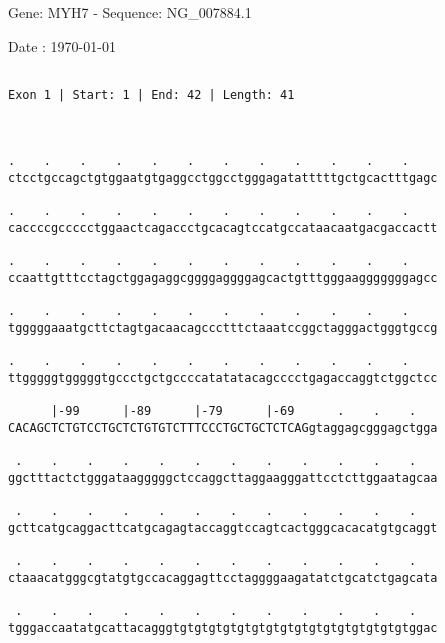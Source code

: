 \documentclass{article}
\begin{document}
\begin{center}
\begin{large}
 Gene: MYH7 - Sequence: NG\_007884.1
 
 Date : \today
\end{large}
\end{center}
 \begin{Verbatim}
 
Exon 1 | Start: 1 | End: 42 | Length: 41



.    .    .    .    .    .    .    .    .    .    .    .    
ctcctgccagctgtggaatgtgaggcctggcctgggagatatttttgctgcactttgagc
                                                            
.    .    .    .    .    .    .    .    .    .    .    .    
caccccgccccctggaactcagaccctgcacagtccatgccataacaatgacgaccactt
                                                            
.    .    .    .    .    .    .    .    .    .    .    .    
ccaattgtttcctagctggagaggcggggaggggagcactgtttgggaagggggggagcc
                                                            
.    .    .    .    .    .    .    .    .    .    .    .    
tgggggaaatgcttctagtgacaacagccctttctaaatccggctagggactgggtgccg
                                                            
.    .    .    .    .    .    .    .    .    .    .    .    
ttgggggtgggggtgccctgctgccccatatatacagcccctgagaccaggtctggctcc
                                                            
      |-99      |-89      |-79      |-69      .    .    .   
CACAGCTCTGTCCTGCTCTGTGTCTTTCCCTGCTGCTCTCAGgtaggagcgggagctgga
                                                            
 .    .    .    .    .    .    .    .    .    .    .    .   
ggctttactctgggataagggggctccaggcttaggaagggattcctcttggaatagcaa
                                                            
 .    .    .    .    .    .    .    .    .    .    .    .   
gcttcatgcaggacttcatgcagagtaccaggtccagtcactgggcacacatgtgcaggt
                                                            
 .    .    .    .    .    .    .    .    .    .    .    .   
ctaaacatgggcgtatgtgccacaggagttcctaggggaagatatctgcatctgagcata
                                                            
 .    .    .    .    .    .    .    .    .    .    .    .   
tgggaccaatatgcattacagggtgtgtgtgtgtgtgtgtgtgtgtgtgtgtgtgtggac
                                                            

\end{Verbatim}
\end{document}
